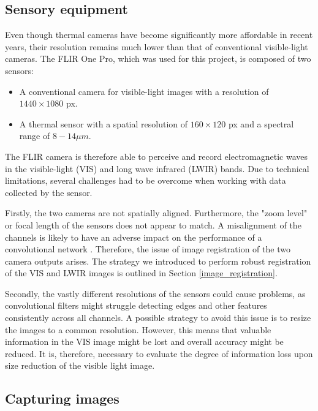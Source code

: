 \documentclass{l4proj}
\begin{document}
\subsection{Sensory equipment}

Even though thermal cameras have become significantly more affordable in recent years, their resolution remains much lower than that of conventional visible-light cameras. The FLIR One Pro, which was used for this project, is composed of two sensors:

\begin{itemize}
  \item A conventional camera for visible-light images with a resolution of $1440 \times 1080$ px.
  \item A thermal sensor with a spatial resolution of $160 \times 120$ px and a spectral range of $8 - 14 \mu m$.
\end{itemize}

The FLIR camera is therefore able to perceive and record electromagnetic waves in the visible-light (VIS) and long wave infrared (LWIR) bands. Due to technical limitations, several challenges had to be overcome when working with data collected by the sensor.

Firstly, the two cameras are not spatially aligned. Furthermore, the "zoom level" or focal length of the sensors does not appear to match. A misalignment of the channels is likely to have an adverse impact on the performance of a convolutional network \citep{chappelow_improving_2008}. Therefore, the issue of image registration of the two camera outputs arises. The strategy we introduced to perform robust registration of the VIS and LWIR images is outlined in Section \ref{image_registration}.

Secondly, the vastly different resolutions of the sensors could cause problems, as convolutional filters might struggle detecting edges and other features consistently across all channels. A possible strategy to avoid this issue is to resize the images to a common resolution. However, this means that valuable information in the VIS image might be lost and overall accuracy might be reduced. It is, therefore, necessary to evaluate the degree of information loss upon size reduction of the visible light image.

\subsection{Capturing images}

\end{document}
